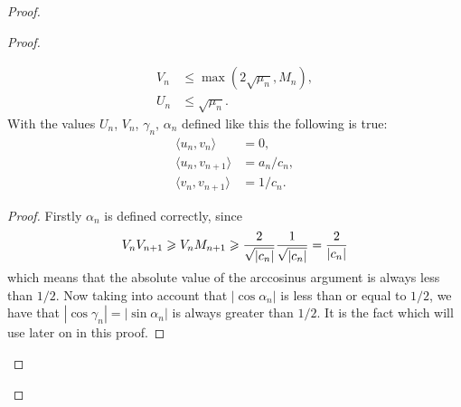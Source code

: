 \documentclass[12pt]{amsart}
\theoremstyle{case}
\begin{document}
\begin{proof}
\begin{proof}
\begin{prop}
\begin{align*}
                      V_n &\leq \max(2\sqrt{\mu_n}, M_n),\\
                      U_n &\leq \sqrt{\mu_n}.
                  \end{align*}
                  With the values $U_n$, $V_n$, $\gamma_n$, $\alpha_n$ defined like this the following is true:
                  \begin{align*}
                      \langle u_n, v_n \rangle &= 0,\\
                      \langle u_n, v_{n+1} \rangle &= a_n/c_n,\\
                      \langle v_n, v_{n+1} \rangle &= 1/c_n.
                  \end{align*}
              \end{prop}
              \begin{proof}
                  Firstly $\alpha_n$ is defined correctly, since
                  $$
                  V_n V_{n+1} \geq V_n M_{n+1} \geq \frac{2}{\sqrt{\smash[b]{|c_n|}}} \frac{1}{\sqrt{\smash[b]{|c_n|}}}
                   = \frac{2}{|c_n|}
                  $$
                  which means that the absolute value of the arccosinus argument is always less than $1/2$. Now taking into
                  account that $|\cos{\alpha_n}|$ is less than or equal to $1/2$, we have that $|\cos{\gamma_n}| = |\sin{\alpha_n}|$ is always greater than $1/2$. It is the fact which will use later on in this proof.
                  

\end{proof}
\end{proof}
\end{proof}
\end{document}
